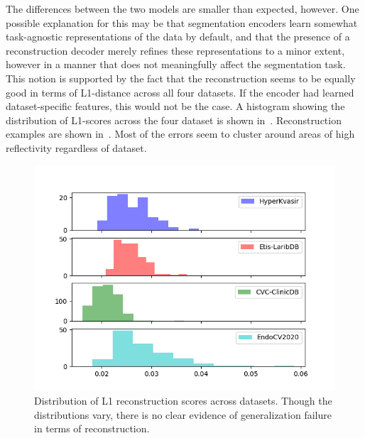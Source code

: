     The differences between the two models are smaller than expected, however. One possible explanation for this may be that segmentation encoders learn somewhat task-agnostic representations of the data by default, and that the presence of a reconstruction decoder merely refines these representations to a minor extent, however in a manner that does not meaningfully affect the segmentation task. This notion is supported by the fact that the reconstruction seems to be equally good in terms of L1-distance across all four datasets. If the encoder had learned dataset-specific features, this would not be the case. A histogram showing the distribution of L1-scores across the four dataset is shown in~. Reconstruction examples are shown in~. Most of the errors seem to cluster around areas of high reflectivity regardless of dataset.  
    
    \begin{figure}[htb]
        \centering
        \includegraphics[width=\linewidth]{illustrations/l1_reconstruction.png}
        \caption[L1 reconstruction distributions across datasets]{Distribution of L1 reconstruction scores across datasets. Though the distributions vary, there is no clear evidence of generalization failure in terms of reconstruction.}
        \label{fig:l1_rec}
    \end{figure}
    

